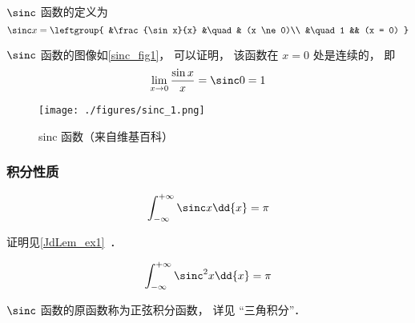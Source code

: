 

$\sinc$ 函数的定义为
\begin{equation}
\sinc x = 
\leftgroup{
&\frac{\sin x}{x} &\quad & (x \ne 0)\\
&\quad 1 && (x = 0)
}\end{equation}

$\sinc$ 函数的图像如\autoref{sinc_fig1}， 可以证明， 该函数在 $x=0$ 处是连续的， 即
\begin{equation}
\lim_{x \to 0}\frac{\sin x}{x} = \sinc 0 = 1
\end{equation}

\begin{figure}[ht]
\centering
\texttt{[image: ./figures/sinc\_1.png]}
\caption{sinc 函数（来自维基百科）} \label{sinc_fig1}
\end{figure}

\subsubsection{积分性质}
\begin{equation}\label{sinc_eq2}
\int_{-\infty}^{+\infty} \sinc x \dd{x} = \pi
\end{equation}

证明见\autoref{JdLem_ex1}~．

\begin{equation}\label{sinc_eq1}
\int_{-\infty}^{+\infty} \sinc^2 x \dd{x} = \pi
\end{equation}

$\sinc$ 函数的原函数称为正弦积分函数， 详见 “三角积分”．
